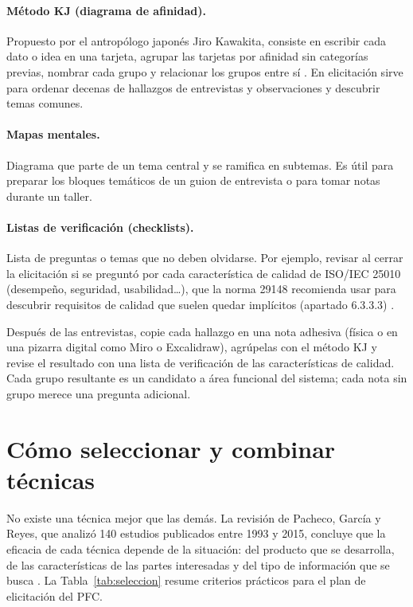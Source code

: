 \documentclass[11pt,a4paper,oneside]{report}
\begin{document}
\paragraph{Método KJ (diagrama de afinidad).} Propuesto por el antropólogo japonés Jiro Kawakita, consiste en escribir cada dato o idea en una tarjeta, agrupar las tarjetas por afinidad sin categorías previas, nombrar cada grupo y relacionar los grupos entre sí \citep{scupin_1997}. En elicitación sirve para ordenar decenas de hallazgos de entrevistas y observaciones y descubrir temas comunes.

\paragraph{Mapas mentales.} Diagrama que parte de un tema central y se ramifica en subtemas. Es útil para preparar los bloques temáticos de un guion de entrevista o para tomar notas durante un taller.

\paragraph{Listas de verificación (checklists).} Lista de preguntas o temas que no deben olvidarse. Por ejemplo, revisar al cerrar la elicitación si se preguntó por cada característica de calidad de ISO/IEC 25010 (desempeño, seguridad, usabilidad\ldots), que la norma 29148 recomienda usar para descubrir requisitos de calidad que suelen quedar implícitos (apartado 6.3.3.3) \citep{iso29148_2018}.

\begin{enlapractica}
	Después de las entrevistas, copie cada hallazgo en una nota adhesiva (física o en una pizarra digital como Miro o Excalidraw), agrúpelas con el método KJ y revise el resultado con una lista de verificación de las características de calidad. Cada grupo resultante es un candidato a área funcional del sistema; cada nota sin grupo merece una pregunta adicional.
\end{enlapractica}

\section{Cómo seleccionar y combinar técnicas}

No existe una técnica mejor que las demás. La revisión de Pacheco, García y Reyes, que analizó 140 estudios publicados entre 1993 y 2015, concluye que la eficacia de cada técnica depende de la situación: del producto que se desarrolla, de las características de las partes interesadas y del tipo de información que se busca \citep{pacheco_2018}. La Tabla~\ref{tab:seleccion} resume criterios prácticos para el plan de elicitación del PFC.
\end{document}
